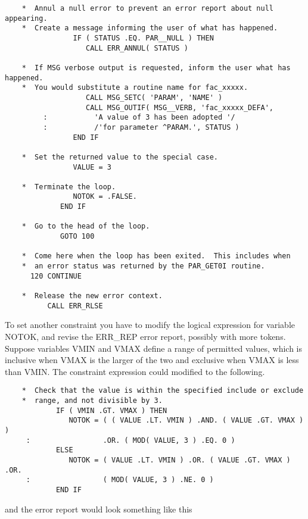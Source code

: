 \documentclass[twoside,11pt]{article}
\begin{document}
\begin{verbatim}
    *  Annul a null error to prevent an error report about null appearing.
    *  Create a message informing the user of what has happened.
                IF ( STATUS .EQ. PAR__NULL ) THEN
                   CALL ERR_ANNUL( STATUS )

    *  If MSG verbose output is requested, inform the user what has happened.
    *  You would substitute a routine name for fac_xxxxx.
                   CALL MSG_SETC( 'PARAM', 'NAME' )
                   CALL MSG_OUTIF( MSG__VERB, 'fac_xxxxx_DEFA',
         :           'A value of 3 has been adopted '/
         :           /'for parameter ^PARAM.', STATUS )
                END IF

    *  Set the returned value to the special case.
                VALUE = 3

    *  Terminate the loop.
                NOTOK = .FALSE.
             END IF

    *  Go to the head of the loop.
             GOTO 100

    *  Come here when the loop has been exited.  This includes when
    *  an error status was returned by the PAR_GET0I routine.
      120 CONTINUE

    *  Release the new error context.
          CALL ERR_RLSE
\end{verbatim}

To set another constraint you have to modify the logical expression
for variable NOTOK, and revise the ERR\_REP error report, possibly
with more tokens.  Suppose variables VMIN and VMAX define a range
of permitted values, which is inclusive when VMAX is the larger of
the two and exclusive when VMAX is less than VMIN.  The constraint
expression could modified to the following.

\begin{verbatim}
    *  Check that the value is within the specified include or exclude
    *  range, and not divisible by 3.
            IF ( VMIN .GT. VMAX ) THEN
               NOTOK = ( ( VALUE .LT. VMIN ) .AND. ( VALUE .GT. VMAX ) )
     :                 .OR. ( MOD( VALUE, 3 ) .EQ. 0 )
            ELSE
               NOTOK = ( VALUE .LT. VMIN ) .OR. ( VALUE .GT. VMAX ) .OR.
     :                 ( MOD( VALUE, 3 ) .NE. 0 )
            END IF
\end{verbatim}

and the error report would look something like this
\end{document}
